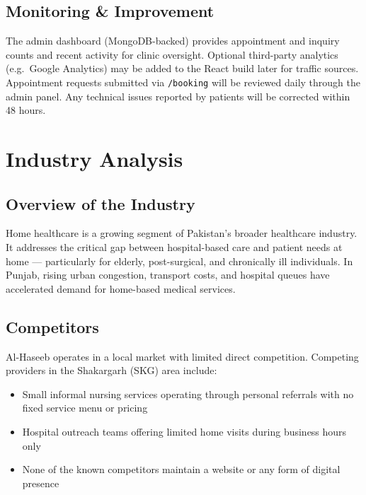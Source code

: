 \documentclass[12pt, a4paper]{article}
\begin{document}
\subsection{Monitoring \& Improvement}
The admin dashboard (MongoDB-backed) provides appointment and inquiry counts and recent activity for clinic oversight. Optional third-party analytics (e.g.\ Google Analytics) may be added to the React build later for traffic sources. Appointment requests submitted via \texttt{/booking} will be reviewed daily through the admin panel. Any technical issues reported by patients will be corrected within 48 hours.

\newpage

\section{Industry Analysis}

\subsection{Overview of the Industry}

Home healthcare is a growing segment of Pakistan's broader healthcare industry. It addresses the critical gap between hospital-based care and patient needs at home — particularly for elderly, post-surgical, and chronically ill individuals. In Punjab, rising urban congestion, transport costs, and hospital queues have accelerated demand for home-based medical services.

\subsection{Competitors}

Al-Haseeb operates in a local market with limited direct competition. Competing providers in the Shakargarh (SKG) area include:

\begin{itemize}[leftmargin=1.4em]
    \item Small informal nursing services operating through personal referrals with no fixed service menu or pricing
    \item Hospital outreach teams offering limited home visits during business hours only
    \item None of the known competitors maintain a website or any form of digital presence
\end{itemize}
\end{document}
